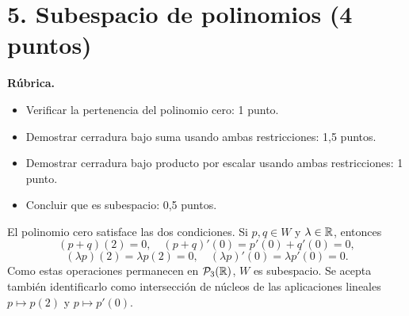 \documentclass[10pt,a4]{examenEPN0}
\begin{document}
\section*{5. Subespacio de polinomios (4 puntos)}
\noindent\textbf{Rúbrica.}
\begin{itemize}[itemsep=2pt]
    \item Verificar la pertenencia del polinomio cero: 1 punto.
    \item Demostrar cerradura bajo suma usando ambas restricciones: 1,5 puntos.
    \item Demostrar cerradura bajo producto por escalar usando ambas restricciones: 1 punto.
    \item Concluir que es subespacio: 0,5 puntos.
\end{itemize}
El polinomio cero satisface las dos condiciones. Si $p,q\in W$ y
$\lambda\in\mathbb{R}$, entonces
\[
    (p+q)(2)=0,\quad (p+q)'(0)=p'(0)+q'(0)=0,
\]
\[
    (\lambda p)(2)=\lambda p(2)=0,\quad
    (\lambda p)'(0)=\lambda p'(0)=0.
\]
Como estas operaciones permanecen en $\mathcal P_3(\mathbb{R})$, $W$ es subespacio.
Se acepta también identificarlo como intersección de núcleos de las
aplicaciones lineales $p\mapsto p(2)$ y $p\mapsto p'(0)$.
\end{document}
